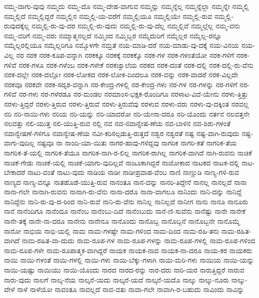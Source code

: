{ನಮ್ಮ-ದಾಗು-ವುವು
ನಮ್ಮದು
ನಮ್ಮ-ದೊ
ನಮ್ಮ-ದೇಹ-ವಾಗುವ
ನಮ್ಮನ್ನು
ನಮ್ಮನ್ನೆಲ್ಲ
ನಮ್ಮನ್ನೆಲ್ಲಾ
ನಮ್ಮನ್ನೇ
ನಮ್ಮಲ್ಲಿ
ನಮ್ಮಲ್ಲಿದೆ
ನಮ್ಮಲ್ಲಿದ್ದರೆ
ನಮ್ಮಲ್ಲಿನ
ನಮ್ಮಲ್ಲಿ-ಯ-ವರೆಗೆ
ನಮ್ಮಲ್ಲಿಯೂ
ನಮ್ಮಲ್ಲಿಯೇ
ನಮ್ಮಲ್ಲಿ-ರುವ
ನಮ್ಮಲ್ಲಿ-ರುವುದಕ್ಕೆಲ್ಲ
ನಮ್ಮಲ್ಲಿ-ರು-ವು-ದರ
ನಮ್ಮಲ್ಲಿ-ರು-ವುದು
ನಮ್ಮಲ್ಲಿ-ರು-ವು-ದೆಲ್ಲ
ನಮ್ಮಲ್ಲಿವೆ
ನಮ್ಮಲ್ಲೆಲ್ಲ
ನಮ್ಮ-ವನು
ನಮ್ಮ-ವರಿಗೆ
ನಮ್ಮ-ವರು
ನಮ್ಮಾತ್ಮನಲ್ಲದೆ
ನಮ್ಮಿಂದ
ನಮ್ಮಿಬ್ಬರ
ನಮ್ಮೆದುರಿಗೆ
ನಮ್ಮೆಲ್ಲರ
ನಮ್ಮೆಲ್ಲ-ರನ್ನೂ
ನಮ್ಮೆಲ್ಲರಲ್ಲಿಯೂ
ನಮ್ಮೆಲ್ಲರಿಗೂ
ನಮ್ಮೊಳಗೇ
ನಮ್ರತೆ
ನಯ-ಮಾಡಿ-ದರೆ
ನಯ-ಮಾಡು-ವು-ದಕ್ಕೆ
ನಯ-ವಿನಯ
ನಯ-ವಿಲ್ಲ
ನರ
ನರಕ
ನರಕ-ಕೂಪ-ವನ್ನಾಗಿ
ನರಕಕ್ಕೂ
ನರಕಕ್ಕೆ
ನರಕಕ್ಕೊ
ನರಕ-ಗಳ
ನರಕ-ಗಳಂತೆಯೋ
ನರಕ-ಗಳಿಗೆ
ನರಕ-ಗಳಿವೆ
ನರಕ-ಗಳೂ
ನರಕ-ಗಳೆಂಬ
ನರಕ-ಗಳೇಕೆ
ನರಕಜ್ವಾಲೆಯ
ನರಕದ
ನರಕ-ದಂತೆ
ನರಕ-ದಲ್ಲಿ
ನರಕ-ದಲ್ಲಿ-ರು-ವೆನು
ನರಕ-ದಲ್ಲೇ
ನರಕ-ದಲ್ಲೋ
ನರಕ-ಲೋಕದ
ನರಕ-ಲೋಕ-ದಿಂದಲೂ
ನರಕ-ವನ್ನು
ನರಕ-ವಾದರೆ
ನರಕ-ವಿಲ್ಲದೇ
ನರಕವೂ
ನರಕವೇ
ನರಕ-ಸದೃಶ-ವನ್ನಾಗಿ
ನರ-ಕೇಂದ್ರ-ಗಳಲ್ಲಿ
ನರ-ಕೇಂದ್ರ-ಗಳು
ನರ-ಗಳ
ನರ-ಗಳನ್ನು
ನರ-ಗಳಿಗೆ
ನರ-ಗಳಿವೆ
ನರ-ಗಳು
ನರ-ಗಳೆರಡೂ
ನರ-ಮಂಡಲ
ನರಮಾಂಸ-ಭಕ್ಷಕ-ರೊಂದಿಗೂ
ನರಳಾಟ-ವಿದೆ-ಯೇನು
ನರಳು-ತ್ತಿತ್ತು
ನರಳು-ತ್ತಿದ್ದರೆ
ನರಳು-ತ್ತಿರುವ
ನರಳು-ತ್ತಿರುವೆ
ನರಳು-ತ್ತಿರುವೆವು
ನರಳುವ
ನರಳು-ವರು
ನರಳು-ವು-ದಕ್ಕಿಂತ
ನರವಲ್ಲ
ನರಿ
ನರಿ-ನಾಯಿ-ಗಳು
ನರಿಯ
ನರಿ-ಯನ್ನು
ನರಿ-ಯಾದರೋ
ನರಿ-ಯೇನಾ-ದರೂ
ನರಿ-ಯೊಂದು
ನರ್ತನ
ನಲವತ್ತನೇ
ನಲವತ್ತು
ನಲಿ-ಯುತ್ತ
ನಲಿ-ಯುತ್ತಿ-ರುವ
ನಲ್ಲಿ
ನವ
ನವ-ನವಾನ್ವೇಷ-ಣೆಯ
ನವ-ಬಾಳಿನ
ನವ-ಶಿಶು-ಗಳಂತೆ
ನವಾನ್ವೇಷಣೆ-ಗಳಿಗೂ
ನವಾನ್ವೇಷ-ಣೆಯ
ನವೀ-ಕರಿಸಲ್ಪಡುತ್ತಿ-ರುತ್ತದೆ
ನಶ್ವರ
ನಶ್ವರತೆ
ನಷ್ಟ
ನಷ್ಟ-ವಾಗಿ-ರುವುದು
ನಷ್ಟ-ವಾಗು-ವುದಿಲ್ಲ
ನಷ್ಟವೂ
ನಾ
ನಾಂದಿ-ಯಾ-ಯಿತು
ನಾಗರ-ಹಾವು-ಗಳಿದ್ದವು
ನಾಗರಿಕ
ನಾಗರಿ-ಕತೆ
ನಾಗರಿಕ-ತೆಯ
ನಾಗರಿಕ-ತೆ-ಯಲ್ಲಿ
ನಾಗರಿಕ-ತೆಯೂ
ನಾಗರಿಕ-ನಾಗಿ-ರ-ಲಿಲ್ಲ
ನಾಗರಿಕ-ರಾಗಿಲ್ಲ
ನಾಗರಿಕ-ವಾಗಿದೆ
ನಾಗಿ-ರುವನು
ನಾಚಿಕೆ
ನಾಚಿಕೆ-ಗೇಡು
ನಾಚಿಕೆ-ಯಲ್ಲಿ
ನಾಚಿಕೆ-ಯಾಗು-ವುದಿಲ್ಲವೆ
ನಾಜೂಕಾಗಿದ್ದರೆ
ನಾಜೋಕಾದ
ನಾಟಕದ
ನಾಟಕ-ದಲ್ಲಿ
ನಾಟ-ಬೇಕಾದರೆ
ನಾಟು-ವಂತೆ
ನಾಟು-ವುದು
ನಾಡಿಯ
ನಾಡೀ
ನಾಡೀಪ್ರವಾಹ-ವೆಂಬ
ನಾಣಿ
ನಾಣ್ಣುಡಿ
ನಾಣ್ಯ-ಗಳಿ-ರುವ
ನಾಣ್ಯದ
ನಾಣ್ಯ-ವನ್ನೂ
ನಾತಹೊಡೆ-ಯುತ್ತಿ-ರುವ
ನಾನಂತೂ
ನಾನ-ದನ್ನು
ನಾನರಿ-ತಿದ್ದೇನೆ
ನಾನಲ್ಲ
ನಾನಲ್ಲದೆ
ನಾನಾ
ನಾನಾ-ಗಲೇ
ನಾನಾಗಿ-ರುವನು
ನಾನಾಗಿ-ರು-ವೆನು
ನಾನಾ-ದರೊ
ನಾನಾ-ವಾಗಲೂ
ನಾನಿಂದು
ನಾನಿ-ದನ್ನು
ನಾನಿದ್ದೆ
ನಾನಿದ್ದೆನು
ನಾನಿ-ರು-ವು-ದ-ರಿಂದ
ನಾನಿ-ರುವೆ
ನಾನಿ-ರು-ವೆನು
ನಾನಿಲ್ಲ
ನಾನಿಲ್ಲದೆ
ನಾನೀಗ
ನಾನು
ನಾನೂ
ನಾನೂರು
ನಾನೆ
ನಾನೆಂದಿಗೂ
ನಾನೆಂದೂ
ನಾನೆಂಬ
ನಾನೆಂಬು-ದಿದೆ
ನಾನೆಂಬುದು
ನಾನೆ-ಣಿ-ಸುವೆನು
ನಾನೆಷ್ಟು
ನಾನೇ
ನಾನೇಕೆ
ನಾನೇ-ತಕ್ಕೆ
ನಾನೇ-ನಾ-ದರೂ
ನಾನೇನು
ನಾನೇನೂ
ನಾನೊಂದು
ನಾನೊಬ್ಬ
ನಾನೊಬ್ಬನೆ
ನಾನೊಬ್ಬನೇ
ನಾನೊಮ್ಮೆ
ನಾನೋ
ನಾಭಿಯ
ನಾಭಿ-ಯಲ್ಲಿ
ನಾಮ
ನಾಮ-ಗಳಷ್ಟೇ
ನಾಮ-ಗಳಿಂದ
ನಾಮ-ದಿಂದ
ನಾಮ-ರಹಿ-ತನು
ನಾಮ-ರಹಿತ-ವಾಗಿದೆ
ನಾಮ-ರಹಿತ-ವಾ-ದುದು
ನಾಮ-ರೂಪ-ಗಳ
ನಾಮ-ರೂಪ-ಗಳನ್ನು
ನಾಮ-ರೂಪ-ಗಳಲ್ಲಿ
ನಾಮ-ರೂಪ-ಗಳಿಂದ
ನಾಮ-ರೂಪ-ಗಳೇ
ನಾಮ-ರೂಪಾತ್ಮಕ-ವಾಗಿದ್ದರೆ
ನಾಯಕ
ನಾಯಕ-ನಾದ
ನಾಯಕ-ನಾ-ದರೂ
ನಾಯ-ಕರ
ನಾಯಕರು
ನಾಯಿ
ನಾಯಿ-ಗಳಂತೆ
ನಾಯಿ-ಗಳಲ್ಲಿ
ನಾಯಿ-ಗಳು
ನಾಯಿ-ಬೆಕ್ಕು-ಗಳಾಗಿ
ನಾಯಿ-ಮರಿ-ಗಳು
ನಾಯಿಯ
ನಾಯಿ-ಯನ್ನು
ನಾಯಿ-ಯಷ್ಟು
ನಾಯಿಯು
ನಾಯಿ-ಯೊಂದು
ನಾರದ
ನಾರದ-ರನ್ನು
ನಾರ-ದರು
ನಾರಿ-ಯರ
ನಾರುತ್ತಿದ್ದರೆ
ನಾರುವ
ನಾರು-ವುದು
ನಾಲಗೆ
ನಾಲ್ಕ-ನೆಯ
ನಾಲ್ಕನೆ-ಯದು
ನಾಲ್ಕನೆ-ಯದೆ
ನಾಲ್ಕನೆ-ಯದೊ
ನಾಲ್ಕು
ನಾಲ್ಕು-ನೂರು
ನಾಲ್ಕು-ವೇಳೆ
ನಾಳೆ
ನಾಳೆಯೋ
ನಾವಂತೂ
ನಾವಲ್ಲದೆ
ನಾವ-ವತು
ನಾವಾ-ಗಲೇ
ನಾವಾಗಿ-ರ-ಬಹುದು
ನಾವಿಂದು
ನಾವಿನ್ನು
}
